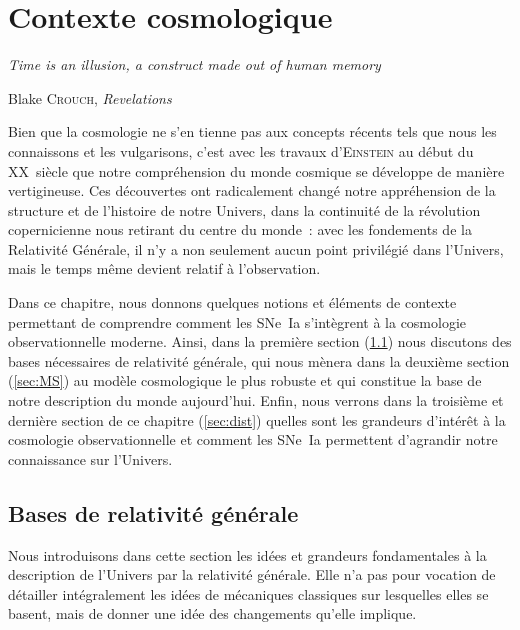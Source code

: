 \documentclass[../main/main.tex]{subfiles}
\begin{document}
\mainmatter

\dominitoc
\faketableofcontents
\dominilof
\fakelistoffigures
\dominilot
\fakelistoftables

\chapter{Contexte cosmologique}\label{ch:cosmo}

\epigraph{\openquote\textit{Time is an illusion, a construct made out of human
memory}\closequote}{Blake \textsc{Crouch}, \textit{Revelations}}

Bien que la cosmologie ne s'en tienne pas aux concepts récents tels que nous les
connaissons et les vulgarisons, c'est avec les travaux d'\textsc{Einstein} au
début du XX\ieme~siècle que notre compréhension du monde cosmique se développe
de manière vertigineuse. Ces découvertes ont radicalement changé notre
appréhension de la structure et de l'histoire de notre Univers, dans la
continuité de la révolution copernicienne nous retirant du centre du monde~:
avec les fondements de la Relativité Générale, il n'y a non seulement aucun
point privilégié dans l'Univers, mais le temps même devient relatif à
l'observation.

Dans ce chapitre, nous donnons quelques notions et éléments de contexte
permettant de comprendre comment les SNe~Ia s'intègrent à la cosmologie
observationnelle moderne. Ainsi, dans la première section (\ref{sec:bases}) nous
discutons des bases nécessaires de relativité générale, qui nous mènera dans la
deuxième section (\ref{sec:MS}) au modèle cosmologique le plus robuste et qui
constitue la base de notre description du monde aujourd'hui. Enfin, nous verrons
dans la troisième et dernière section de ce chapitre (\ref{sec:dist}) quelles
sont les grandeurs d'intérêt à la cosmologie observationnelle et comment les
SNe~Ia permettent d'agrandir notre connaissance sur l'Univers.

\vfill
\minitoc
\vfill

\newpage

\section{Bases de relativité générale}\label{sec:bases}

Nous introduisons dans cette section les idées et grandeurs fondamentales à la
description de l'Univers par la relativité générale. Elle n'a pas pour vocation
de détailler intégralement les idées de mécaniques classiques sur lesquelles
elles se basent, mais de donner une idée des changements qu'elle implique.
\end{document}
